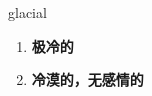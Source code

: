 
\begin{frame}
{\huge glacial}
\begin{center}
\begin{enumerate}\Large
  \item \textbf{极冷的}
  \item \textbf{冷漠的，无感情的}
\end{enumerate}
\end{center}
\end{frame}
